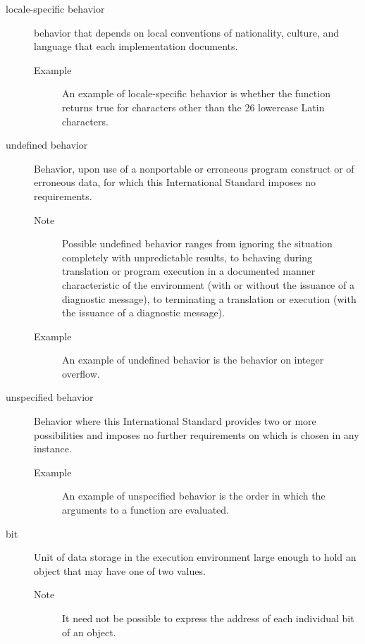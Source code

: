 \begin{faq}
\begin{description}
        \item[locale-specific behavior] behavior that depends on local
        conventions of nationality, culture, and language that each implementation
        documents.
        \begin{description}
                \item[Example] An example of locale-specific behavior is whether 
                the  function returns true for characters other than 
                the 26 lowercase Latin characters.
        \end{description}

        \item[undefined behavior] 
        Behavior, upon use of a nonportable or erroneous program construct or 
        of erroneous data, for which this International Standard imposes
        no requirements.

        \begin{description}
                \item[Note] Possible undefined behavior ranges from ignoring 
                the situation completely with unpredictable results, to behaving 
                during translation or program execution in a documented manner 
                characteristic of the environment (with or without the issuance 
                of a diagnostic message), to terminating a translation or 
                execution (with the issuance of a diagnostic message).
                \item[Example] An example of undefined behavior is the behavior 
                on integer overflow.
        \end{description}

        \item[unspecified behavior]
        Behavior where this International 
        Standard provides two or more possibilities and imposes no further 
        requirements on which is chosen in any instance.
        \begin{description}
                \item[Example] An example of unspecified behavior is the order 
                in which the arguments to a function are evaluated.
        \end{description}

        \item[bit]
        Unit of data storage in the execution environment large enough to hold
        an object that may have one of two values.
        \begin{description}
                \item[Note] It need not be possible to express the address of each individual
        bit of an object.
        \end{description}


\end{description}
\end{faq}
